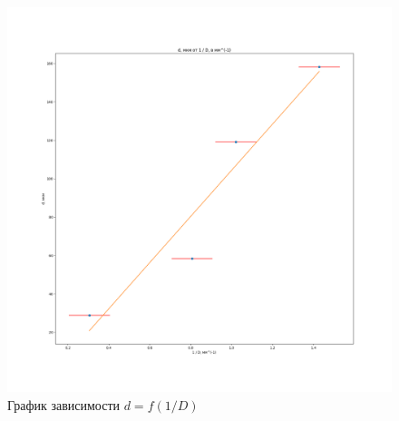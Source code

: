 \documentclass[a4paper, 12pt]{article}
\begin{document}
\begin{enumerate}
    \begin{figure}[!h]
        \centering
        \includegraphics[scale = 0.4]{graph1.png}
        \caption{График зависимости $d = f \left( 1 / D \right)$}
        \label{graph1}
    \end{figure}
\end{enumerate}
\end{document}
